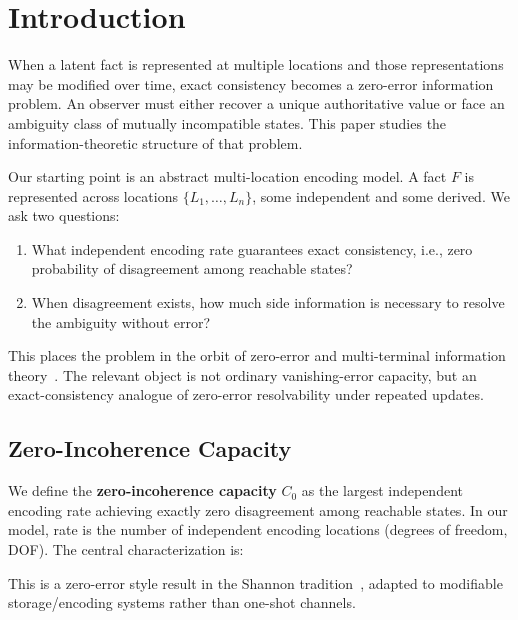 \section{Introduction}\label{introduction}

When a latent fact is represented at multiple locations and those representations may be modified over time, exact consistency becomes a zero-error information problem. An observer must either recover a unique authoritative value or face an ambiguity class of mutually incompatible states. This paper studies the information-theoretic structure of that problem.

Our starting point is an abstract multi-location encoding model. A fact $F$ is represented across locations $\{L_1,\dots,L_n\}$, some independent and some derived. We ask two questions:

\begin{enumerate}
\item What independent encoding rate guarantees exact consistency, i.e., zero probability of disagreement among reachable states?
\item When disagreement exists, how much side information is necessary to resolve the ambiguity without error?
\end{enumerate}

This places the problem in the orbit of zero-error and multi-terminal information theory~\cite{shannon1956zero,korner1973graphs,lovasz1979shannon,slepian1973noiseless}. The relevant object is not ordinary vanishing-error capacity, but an exact-consistency analogue of zero-error resolvability under repeated updates.

\subsection{Zero-Incoherence Capacity}\label{sec:encoding-problem}

We define the \textbf{zero-incoherence capacity} $C_0$ as the largest independent encoding rate achieving exactly zero disagreement among reachable states. In our model, rate is the number of independent encoding locations (degrees of freedom, DOF). The central characterization is:

\begin{center}
\end{center}

This is a zero-error style result in the Shannon tradition~\cite{shannon1956zero,korner1973graphs,lovasz1979shannon}, adapted to modifiable storage/encoding systems rather than one-shot channels.

